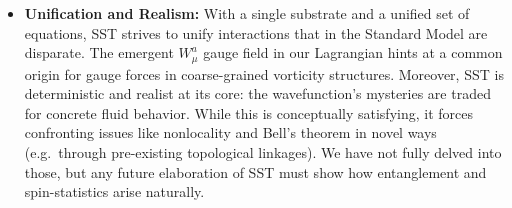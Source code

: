 \documentclass[10pt,reprint,aps,onecolumn,nofootinbib]{revtex4-2}
\begin{document}
\begin{itemize}
    \item \textbf{Unification and Realism:} With a single substrate and a unified set of equations, SST strives to unify interactions that in the Standard Model are disparate. The emergent $W_\mu^a$ gauge field in our Lagrangian hints at a common origin for gauge forces in coarse-grained vorticity structures. Moreover, SST is deterministic and realist at its core: the wavefunction’s mysteries are traded for concrete fluid behavior. While this is conceptually satisfying, it forces confronting issues like nonlocality and Bell's theorem in novel ways (e.g.\ through pre-existing topological linkages). We have not fully delved into those, but any future elaboration of SST must show how entanglement and spin-statistics arise naturally.
\end{itemize}
\end{document}
